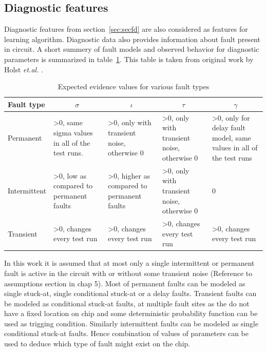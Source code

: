 \subsection{Diagnostic features}
Diagnostic features from section~\ref{sec:secfd} are also considered as features for learning algorithm. Diagnostic data also provides information about fault present in circuit. A short summery of fault models and observed behavior for diagnostic parameters is summarized in table~\ref{tab:diagparam}. This table is taken from original work by Holst \emph{et.al.} \cite{Holst2009}.

\begin{table}[h]
\captionsetup{justification=centering}

\begin{tabular}{p{2cm}p{2.5cm}p{2.5cm}p{2.5cm}p{2.5cm}}
\hline
Fault type   & \multicolumn{1}{c}{$\sigma$}                              & \multicolumn{1}{c}{$\iota$}                           & \multicolumn{1}{c}{$\tau$}                            & \multicolumn{1}{c}{$\gamma$}                                                   \\ \hline
Permanent    & \textgreater0, same sigma values in all of the test runs. & \textgreater0, only with transient noise, otherwise 0 & \textgreater0, only with transient noise, otherwise 0 & \textgreater0, only for delay fault model, same values in all of the test runs \\
Intermittent & \textgreater0, low as compared to permanent faults        & \textgreater0, higher as compared to permanent faults & \textgreater0, only with transient noise, otherwise 0 & 0                                                                              \\
Transient    & \textgreater0, changes every test run                     & \textgreater0, changes every test run                 & \textgreater0, changes every test run                 & \textgreater0, changes every test run                                         \\
\hline
\end{tabular}

\caption{Expected evidence values for various fault types}
\label{tab:diagparam}
\end{table}


In this work it is assumed that at most only a single intermittent or permanent fault is active in the circuit with or without some transient noise (Reference to assumptions section in chap 5). Most of permanent faults can be modeled as single stuck-at, single conditional stuck-at or a delay faults. Transient faults can be modeled as conditional stuck-at faults, at multiple fault sites as the do not have a fixed location on chip and some deterministic probability function can be used as trigging condition. Similarly intermittent faults can be modeled as single conditional stuck-at faults. Hence combination of values of parameters can be used to deduce which type of fault might exist on the chip.

